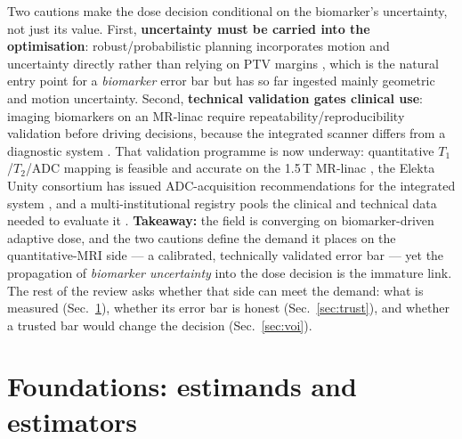 \documentclass[review,number]{elsarticle}
\begin{document}
Two cautions make the dose decision conditional on the biomarker's uncertainty, not just
its value. First, \textbf{uncertainty must be carried into the optimisation}:
robust/probabilistic planning incorporates motion and uncertainty directly rather than
relying on PTV margins \cite{unkelbach2018}, which is the natural entry point for a
\emph{biomarker} error bar but has so far ingested mainly geometric and motion
uncertainty. Second, \textbf{technical validation gates clinical use}: imaging biomarkers
on an MR-linac require repeatability/reproducibility validation before driving decisions,
because the integrated scanner differs from a diagnostic system
\cite{vanhoudt2021qib}.%
{} That validation programme is now underway: quantitative $T_1$/$T_2$/ADC mapping is
feasible and accurate on the 1.5\,T MR-linac \cite{kooreman2019}, the Elekta Unity
consortium has issued ADC-acquisition recommendations for the integrated system
\cite{kooreman2020}, and a multi-institutional registry pools the clinical and technical
data needed to evaluate it \cite{demolvanotterloo2020}. \textbf{Takeaway:} the field is
converging on biomarker-driven adaptive dose, and the
two cautions define the demand it places on the quantitative-MRI side --- a calibrated,
technically validated error bar --- yet the propagation of \emph{biomarker uncertainty}
into the dose decision is the immature link. The rest of the review asks whether that
side can meet the demand: what is measured (Sec.~\ref{sec:foundations}), whether its
error bar is honest (Sec.~\ref{sec:trust}), and whether a trusted bar would change the
decision (Sec.~\ref{sec:voi}).

\section{Foundations: estimands and estimators}
\label{sec:foundations}
\end{document}
